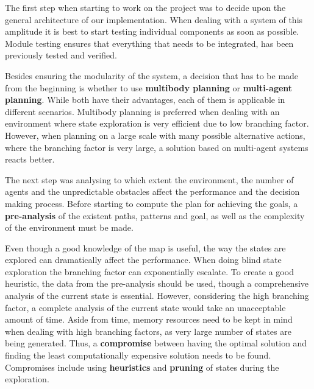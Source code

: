 The first step when starting to work on the project was to decide upon the general architecture of our
implementation. When dealing with a system of this amplitude it is best to start testing individual components
as soon as possible. Module testing ensures that everything that needs to be integrated, has been previously
tested and verified.

Besides ensuring the modularity of the system, a decision that has to be made from the beginning is whether to
use \textbf{multibody planning} or \textbf{multi-agent planning}. While both have their advantages, each of
them is applicable in different scenarios. Multibody planning is preferred when dealing with an environment
where state exploration is very efficient due to low branching factor. However, when planning on a large scale
with many possible alternative actions, where the branching factor is very large, a solution based on
multi-agent systems reacts better.

The next step was analysing to which extent the environment, the number of agents and the unpredictable
obstacles affect the performance and the decision making process. Before starting to compute the plan for
achieving the goals, a \textbf{pre-analysis} of the existent paths, patterns and goal, as well as the
complexity of the environment must be made.

Even though a good knowledge of the map is useful, the way the states are explored can dramatically affect the
performance. When doing blind state exploration the branching factor can exponentially escalate. To create a
good heuristic, the data from the pre-analysis should be used, though a comprehensive analysis of the  current
state is essential. However, considering the high branching factor, a complete analysis of the current state
would take an unacceptable amount of time. Aside from time, memory resources need to be kept in mind when
dealing with high branching factors, as very large number of states are being generated. Thus, a
\textbf{compromise} between having the optimal solution and finding the least computationally expensive
solution needs to be found. Compromises include using \textbf{heuristics} and \textbf{pruning} of states
during the exploration.

